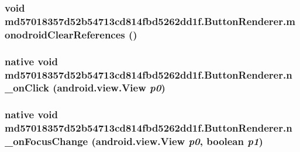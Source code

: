 \hypertarget{classmd57018357d52b54713cd814fbd5262dd1f_1_1_button_renderer_82a2afe9fa4940b1718a61bfce8ee0df}{
\subsubsection[{monodroidClearReferences}]{\setlength{\rightskip}{0pt plus 5cm}void md57018357d52b54713cd814fbd5262dd1f.ButtonRenderer.monodroidClearReferences ()}}
\label{classmd57018357d52b54713cd814fbd5262dd1f_1_1_button_renderer_82a2afe9fa4940b1718a61bfce8ee0df}


\hypertarget{classmd57018357d52b54713cd814fbd5262dd1f_1_1_button_renderer_444e04ce6573dd09967b25af7df43b31}{
\subsubsection[{n\_\-onClick}]{\setlength{\rightskip}{0pt plus 5cm}native void md57018357d52b54713cd814fbd5262dd1f.ButtonRenderer.n\_\-onClick (android.view.View {\em p0})}}
\label{classmd57018357d52b54713cd814fbd5262dd1f_1_1_button_renderer_444e04ce6573dd09967b25af7df43b31}


\hypertarget{classmd57018357d52b54713cd814fbd5262dd1f_1_1_button_renderer_cafdc35bd214953c92f41b73511cf15b}{
\subsubsection[{n\_\-onFocusChange}]{\setlength{\rightskip}{0pt plus 5cm}native void md57018357d52b54713cd814fbd5262dd1f.ButtonRenderer.n\_\-onFocusChange (android.view.View {\em p0}, \/  boolean {\em p1})}}
\label{classmd57018357d52b54713cd814fbd5262dd1f_1_1_button_renderer_cafdc35bd214953c92f41b73511cf15b}


